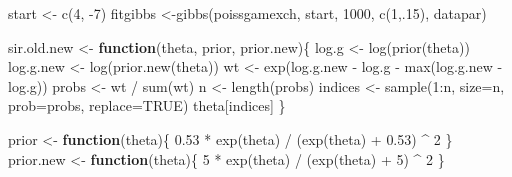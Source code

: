 \documentclass[
]{book}
\newenvironment{Shaded}{\begin{snugshade}}{\end{snugshade}}
\newcommand{\AttributeTok}[1]{\textcolor[rgb]{0.77,0.63,0.00}{#1}}
\newcommand{\ConstantTok}[1]{\textcolor[rgb]{0.00,0.00,0.00}{#1}}
\newcommand{\ControlFlowTok}[1]{\textcolor[rgb]{0.13,0.29,0.53}{\textbf{#1}}}
\newcommand{\DecValTok}[1]{\textcolor[rgb]{0.00,0.00,0.81}{#1}}
\newcommand{\FloatTok}[1]{\textcolor[rgb]{0.00,0.00,0.81}{#1}}
\newcommand{\FunctionTok}[1]{\textcolor[rgb]{0.00,0.00,0.00}{#1}}
\newcommand{\NormalTok}[1]{#1}
\newcommand{\OtherTok}[1]{\textcolor[rgb]{0.56,0.35,0.01}{#1}}
\newcommand{\SpecialCharTok}[1]{\textcolor[rgb]{0.00,0.00,0.00}{#1}}
\begin{document}
\begin{Shaded}
\begin{Highlighting}[]
\NormalTok{start }\OtherTok{\textless{}{-}} \FunctionTok{c}\NormalTok{(}\DecValTok{4}\NormalTok{, }\SpecialCharTok{{-}}\DecValTok{7}\NormalTok{)}
\NormalTok{fitgibbs }\OtherTok{\textless{}{-}}\FunctionTok{gibbs}\NormalTok{(poissgamexch, }
\NormalTok{                 start, }\DecValTok{1000}\NormalTok{, }
                 \FunctionTok{c}\NormalTok{(}\DecValTok{1}\NormalTok{,.}\DecValTok{15}\NormalTok{), datapar)}
\end{Highlighting}
\end{Shaded}

\begin{Shaded}
\begin{Highlighting}[]
\NormalTok{sir.old.new }\OtherTok{\textless{}{-}} \ControlFlowTok{function}\NormalTok{(theta, prior, prior.new)\{}
\NormalTok{  log.g }\OtherTok{\textless{}{-}} \FunctionTok{log}\NormalTok{(}\FunctionTok{prior}\NormalTok{(theta))}
\NormalTok{  log.g.new }\OtherTok{\textless{}{-}} \FunctionTok{log}\NormalTok{(}\FunctionTok{prior.new}\NormalTok{(theta))}
\NormalTok{  wt }\OtherTok{\textless{}{-}} \FunctionTok{exp}\NormalTok{(log.g.new }\SpecialCharTok{{-}}\NormalTok{ log.g }\SpecialCharTok{{-}}
              \FunctionTok{max}\NormalTok{(log.g.new }\SpecialCharTok{{-}}\NormalTok{ log.g))}
\NormalTok{  probs }\OtherTok{\textless{}{-}}\NormalTok{ wt }\SpecialCharTok{/} \FunctionTok{sum}\NormalTok{(wt)}
\NormalTok{  n }\OtherTok{\textless{}{-}} \FunctionTok{length}\NormalTok{(probs)}
\NormalTok{  indices }\OtherTok{\textless{}{-}} \FunctionTok{sample}\NormalTok{(}\DecValTok{1}\SpecialCharTok{:}\NormalTok{n, }\AttributeTok{size=}\NormalTok{n, }
                    \AttributeTok{prob=}\NormalTok{probs, }\AttributeTok{replace=}\ConstantTok{TRUE}\NormalTok{)}
\NormalTok{  theta[indices]}
\NormalTok{\}}
\end{Highlighting}
\end{Shaded}

\begin{Shaded}
\begin{Highlighting}[]
\NormalTok{prior }\OtherTok{\textless{}{-}} \ControlFlowTok{function}\NormalTok{(theta)\{}
  \FloatTok{0.53} \SpecialCharTok{*} \FunctionTok{exp}\NormalTok{(theta) }\SpecialCharTok{/}\NormalTok{ (}\FunctionTok{exp}\NormalTok{(theta) }\SpecialCharTok{+} \FloatTok{0.53}\NormalTok{) }\SpecialCharTok{\^{}} \DecValTok{2}
\NormalTok{\}}
\NormalTok{prior.new }\OtherTok{\textless{}{-}} \ControlFlowTok{function}\NormalTok{(theta)\{}
  \DecValTok{5} \SpecialCharTok{*} \FunctionTok{exp}\NormalTok{(theta) }\SpecialCharTok{/}\NormalTok{ (}\FunctionTok{exp}\NormalTok{(theta) }\SpecialCharTok{+} \DecValTok{5}\NormalTok{) }\SpecialCharTok{\^{}} \DecValTok{2}
\NormalTok{\}}
\end{Highlighting}
\end{Shaded}
\end{document}
